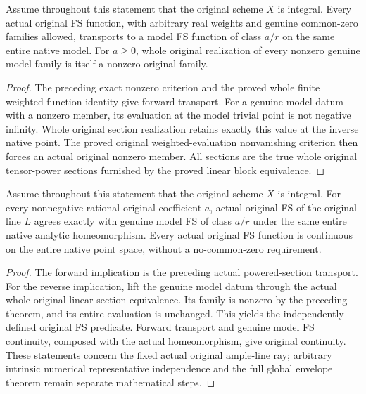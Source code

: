 \begin{theorem}
\label{thm:native-ample-model-full-fs-transport}
\leanok
{}
Assume throughout this statement that the original scheme $X$ is integral.
Every actual original FS function, with arbitrary real weights and genuine
common-zero families allowed, transports to a model FS function of class
$a/r$ on the same entire native model. For $a\ge0$, whole original realization
of every nonzero genuine model family is itself a nonzero original family.
\end{theorem}
\begin{proof}
The preceding exact nonzero criterion and the proved whole finite weighted
function identity give forward transport. For a genuine model datum with a
nonzero member, its evaluation at the model trivial point is not negative
infinity. Whole original section realization retains exactly this value at
the inverse native point. The proved original weighted-evaluation nonvanishing
criterion then forces an actual original nonzero member. All sections are the
true whole original tensor-power sections furnished by the proved linear
block equivalence.
\end{proof}

\begin{theorem}
\label{thm:native-ample-model-full-fs-iff}
\leanok
{}
Assume throughout this statement that the original scheme $X$ is integral.
For every nonnegative rational original coefficient $a$, actual original FS
of the original line $L$ agrees exactly with genuine model FS of class $a/r$
under the same entire native analytic homeomorphism. Every actual original
FS function is continuous on the entire native point space, without a
no-common-zero requirement.
\end{theorem}
\begin{proof}
The forward implication is the preceding actual powered-section transport.
For the reverse implication, lift the genuine model datum through the actual
whole original linear section equivalence. Its family is nonzero by the
preceding theorem, and its entire evaluation is unchanged. This yields the
independently defined original FS predicate. Forward transport and genuine
model FS continuity, composed with the actual homeomorphism, give original
continuity. These statements concern the fixed actual original ample-line ray;
arbitrary intrinsic numerical representative independence and the full global
envelope theorem remain separate mathematical steps.
\end{proof}
